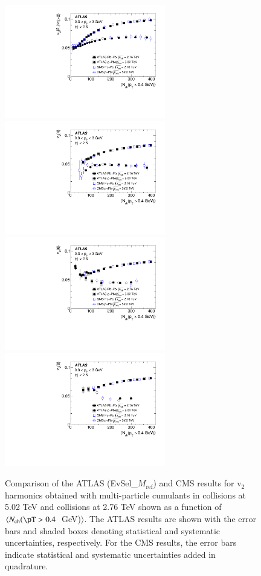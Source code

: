 \documentclass[cernpreprint,texlive=2014,txfonts,UKenglish]{latex/atlasdoc}
\begin{document}
\begin{figure}[htb!]
\begin{center}
\includegraphics[width=70mm]{fig_15a.pdf}
\includegraphics[width=70mm]{fig_15b.pdf}
\includegraphics[width=70mm]{fig_15c.pdf}
\includegraphics[width=70mm]{fig_15d.pdf}
\caption{Comparison of  the ATLAS  (EvSel\_$M_{\mathrm{ref}}$) and CMS \cite{pPbcms3} results for $\mathrm{v}_2$ harmonics obtained with multi-particle cumulants in \pPb collisions at 5.02 TeV and \PbPb collisions at 2.76 TeV  shown as a function of $\langle N_{\mathrm{ch}}(\pT > 0.4$~GeV)$\rangle$. The ATLAS results are shown with the error bars and shaded boxes denoting statistical and systematic uncertainties, respectively. For the CMS results, the error bars indicate statistical and systematic uncertainties added in quadrature.}
\label{fig:comp_Pbcms} 
\end{center}
\end{figure}
\end{document}
